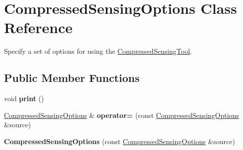 \section{Compressed\+Sensing\+Options Class Reference}
\label{classPecos_1_1CompressedSensingOptions}


Specify a set of options for using the \hyperlink{classPecos_1_1CompressedSensingTool}{Compressed\+Sensing\+Tool}.  


\subsection*{Public Member Functions}
\begin{DoxyCompactItemize}
\item 
void {\bfseries print} ()\label{classPecos_1_1CompressedSensingOptions_a388f572c62279f839ee138a9afbdeeb5}

\item 
\hyperlink{classPecos_1_1CompressedSensingOptions}{Compressed\+Sensing\+Options} \& {\bfseries operator=} (const \hyperlink{classPecos_1_1CompressedSensingOptions}{Compressed\+Sensing\+Options} \&source)\label{classPecos_1_1CompressedSensingOptions_af453c626039ee0fc37039f9f33543ba9}

\item 
{\bfseries Compressed\+Sensing\+Options} (const \hyperlink{classPecos_1_1CompressedSensingOptions}{Compressed\+Sensing\+Options} \&source)\label{classPecos_1_1CompressedSensingOptions_adc0fc39a0f69e3bfd07f0824711a8c44}

\end{DoxyCompactItemize}

